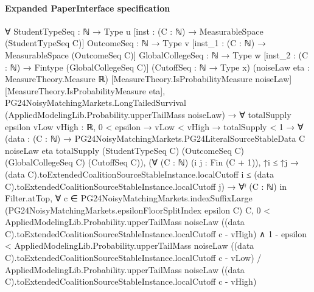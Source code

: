 \documentclass[10pt]{article}
\begin{document}
\paragraph{Expanded PaperInterface specification}
\begin{ReviewVerbatim}
∀ {StudentTypeSeq : ℕ → Type u} [inst : (C : ℕ) → MeasurableSpace (StudentTypeSeq C)] {OutcomeSeq : ℕ → Type v}
  [inst_1 : (C : ℕ) → MeasurableSpace (OutcomeSeq C)] {GlobalCollegeSeq : ℕ → Type w}
  [inst_2 : (C : ℕ) → Fintype (GlobalCollegeSeq C)] (CutoffSeq : ℕ → Type x) (noiseLaw eta : MeasureTheory.Measure ℝ)
  [MeasureTheory.IsProbabilityMeasure noiseLaw] [MeasureTheory.IsProbabilityMeasure eta],
  PG24NoisyMatchingMarkets.LongTailedSurvival (AppliedModelingLib.Probability.upperTailMass noiseLaw) →
    ∀ {totalSupply epsilon vLow vHigh : ℝ},
      0 < epsilon →
        vLow < vHigh →
          totalSupply < 1 →
            ∀
              (data :
                (C : ℕ) →
                  PG24NoisyMatchingMarkets.PG24LiteralSourceStableData C noiseLaw eta totalSupply (StudentTypeSeq C)
                    (OutcomeSeq C) (GlobalCollegeSeq C) (CutoffSeq C)),
              (∀ (C : ℕ) (i j : Fin (C + 1)),
                  ↑i ≤ ↑j →
                    (data C).toExtendedCoalitionSourceStableInstance.localCutoff i ≤
                      (data C).toExtendedCoalitionSourceStableInstance.localCutoff j) →
                ∀ᶠ (C : ℕ) in Filter.atTop,
                  ∀
                    c ∈
                      PG24NoisyMatchingMarkets.indexSuffixLarge
                        (PG24NoisyMatchingMarkets.epsilonFloorSplitIndex epsilon C) C,
                    0 <
                        AppliedModelingLib.Probability.upperTailMass noiseLaw
                          ((data C).toExtendedCoalitionSourceStableInstance.localCutoff c - vHigh) ∧
                      1 - epsilon <
                        AppliedModelingLib.Probability.upperTailMass noiseLaw
                            ((data C).toExtendedCoalitionSourceStableInstance.localCutoff c - vLow) /
                          AppliedModelingLib.Probability.upperTailMass noiseLaw
                            ((data C).toExtendedCoalitionSourceStableInstance.localCutoff c - vHigh)
\end{ReviewVerbatim}
\end{document}
